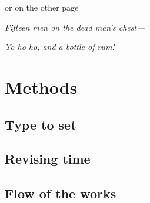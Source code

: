 \documentclass[pdf]{beamer}
\begin{document}
\begin{frame}{or on the other page}

  {\hfil\sl{}Fifteen men on the dead man's chest---}

             {\hfil\sl{}Yo-ho-ho, and a bottle of rum!}
\end{frame}

\section{Methods}
\subsection{Type to set}
\subsection{Revising time}
\subsection{Flow of the works}
\end{document}
